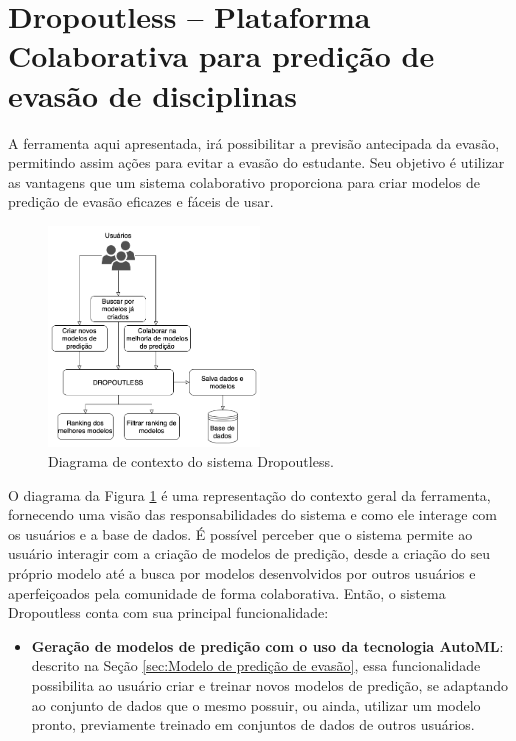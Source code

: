 \documentclass[12pt]{article}
\begin{document}
\section{Dropoutless -- Plataforma Colaborativa para predição de evasão de disciplinas} \label{sec:plataforma}

A ferramenta aqui apresentada, irá possibilitar a previsão antecipada da evasão, permitindo assim ações para evitar a evasão do estudante. Seu objetivo é utilizar as vantagens que um sistema colaborativo proporciona para criar modelos de predição de evasão eficazes e fáceis de usar.

\begin{figure}[ht]
\centering
\includegraphics[width=0.5\textwidth]{images/contexto.png}
\caption{Diagrama de contexto do sistema Dropoutless.}
\label{fig:contexto}
\end{figure}

O diagrama da Figura \ref{fig:contexto} é uma representação do contexto geral da ferramenta, fornecendo uma visão das responsabilidades do sistema e como ele interage com os usuários e a base de dados. É possível perceber que o sistema permite ao usuário interagir com a criação de modelos de predição, desde a criação do seu próprio modelo até a busca por modelos desenvolvidos por outros usuários e aperfeiçoados pela comunidade de forma colaborativa. Então, o sistema Dropoutless conta com sua principal funcionalidade: 

\begin{itemize}
    \item \textbf{Geração de modelos de predição com o uso da tecnologia AutoML}: descrito na Seção \ref{sec:Modelo de predição de evasão}, essa funcionalidade possibilita ao usuário criar e treinar novos modelos de predição, se adaptando ao conjunto de dados que o mesmo possuir, ou ainda, utilizar um modelo pronto, previamente treinado em conjuntos de dados de outros usuários.
\end{itemize}
\end{document}
